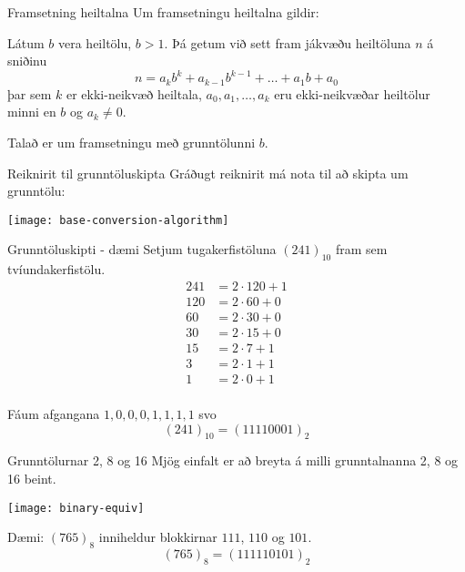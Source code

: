 \documentclass[handout]{beamer}
\begin{document}
\begin{frame}{Framsetning heiltalna}
Um framsetningu heiltalna gildir:

\begin{tcolorbox}[title=Framsetning heiltalna]
Látum $b$ vera heiltölu, $b > 1$. Þá getum við sett fram jákvæðu heiltöluna $n$ á sniðinu
\[
 n = a_kb^k + a_{k-1}b^{k-1} + \ldots + a_1b + a_0
\]
þar sem $k$ er ekki-neikvæð heiltala, $a_0, a_1, \ldots, a_k$ eru ekki-neikvæðar heiltölur minni en $b$ og $a_k \neq 0$.
\end{tcolorbox}
Talað er um framsetningu með grunntölunni $b$.
\end{frame}

\begin{frame}{Reiknirit til grunntöluskipta}
Gráðugt reiknirit má nota til að skipta um grunntölu:
\begin{center}
\texttt{[image: base-conversion-algorithm]}
\end{center}
\end{frame}

\begin{frame}{Grunntöluskipti - dæmi}
\vspace{0.5cm}
Setjum tugakerfistöluna $(241)_{10}$ fram sem tvíundakerfistölu.
\begin{align*}
241 &= 2 \cdot 120 + 1\\
120 &= 2 \cdot 60 + 0\\
60 &= 2 \cdot 30 + 0\\
30 &= 2 \cdot 15 + 0\\
15 &= 2 \cdot 7 + 1\\
3 &= 2 \cdot 1 + 1\\
1&= 2 \cdot 0 + 1\\
\end{align*}

\vspace{-0.8cm}
Fáum afgangana $1, 0, 0, 0, 1, 1, 1, 1$ svo
\[
 (241)_{10} = (11110001)_2
\]
\end{frame}

\begin{frame}{Grunntölurnar 2, 8 og 16}
    Mjög einfalt er að breyta á milli grunntalnanna 2, 8 og 16 beint.
    \vspace{0.5cm}

    \texttt{[image: binary-equiv]}

    Dæmi: $(765)_8$ inniheldur blokkirnar $111$, $110$ og $101$.\\
    \[
        (765)_8 = (111 110 101)_2
    \]
\end{frame}
\end{document}
